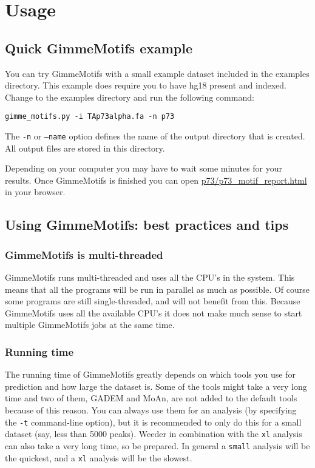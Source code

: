 \documentclass[11pt]{article}
\begin{document}
\section{Usage}
\subsection{Quick GimmeMotifs example}
You can try GimmeMotifs with a small example dataset included in the examples directory. This example does require you to have hg18 present and indexed. 
Change to the examples directory and run the following command:
\begin{verbatim}
gimme_motifs.py -i TAp73alpha.fa -n p73
\end{verbatim}

The \texttt{-n} or \texttt{--name} option defines the name of the output directory that is created. All output files are stored in this directory.

Depending on your computer you may have to wait some minutes for your results. Once GimmeMotifs is finished you can open \url{p73/p73_motif_report.html} in your browser. 

\subsection{Using GimmeMotifs: best practices and tips}
\subsubsection{GimmeMotifs is multi-threaded}
GimmeMotifs runs multi-threaded and uses all the CPU's in the system. This means that all the programs will be run in parallel as much as possible. Of course some programs are still single-threaded, and will not benefit from this. Because GimmeMotifs uses all the available CPU's it does not make much sense to start multiple GimmeMotifs jobs at the same time. 

\subsubsection{Running time}
The running time of GimmeMotifs greatly depends on which tools you use for prediction and how large the dataset is. Some of the tools might take a very long time and two of them, GADEM and MoAn, are not added to the default tools because of this reason. You can always use them for an analysis (by specifying the \texttt{-t} command-line option), but it is recommended to only do this for a small dataset (say, less than 5000 peaks). Weeder in combination with the \texttt{xl} analysis can also take a very long time, so be prepared. In general a \texttt{small} analysis will be the quickest, and a \texttt{xl} analysis will be the slowest.
\end{document}
